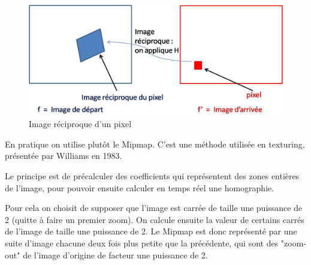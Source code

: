 




\begin{figure}[h!]
\centering
\includegraphics[scale=0.5]{imagereciproque.jpg}
\caption{Image réciproque d'un pixel}
\end{figure}

En pratique on utilise plutôt le Mipmap. C'est une méthode utilisée en texturing, présentée par Williams en 1983.


Le principe est de précalculer des coefficients qui représentent des zones entières de l'image, pour pouvoir ensuite calculer en temps réel une homographie. 

Pour cela on choisit de supposer que l'image est carrée de taille une puissance de 2 (quitte à faire un premier zoom). On calcule ensuite la valeur de certains carrés de l'image de taille une puissance de 2.
Le Mipmap est donc représenté par une suite d'image chacune deux fois plus petite que la précédente, qui sont des "zoom-out" de l'image d'origine de facteur une puissance de 2.

